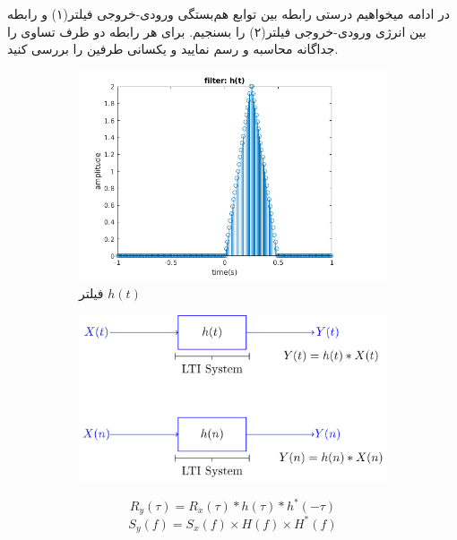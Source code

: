 \documentclass[14pt, professionalfont]{article}
\begin{document}
\begin{enumerate}
    در ادامه میخواهیم درستی رابطه بین توابع هم‌بستگی ورودی-خروجی فیلتر(۱) و رابطه بین انرژی ورودی-خروجی فیلتر(۲) را بسنجیم. برای هر رابطه دو طرف تساوی را جداگانه محاسبه و رسم نمایید و یکسانی طرفین را بررسی کنید.
    
   
\begin{figure}[h]
	\begin{subfigure}{.5\textwidth}
		\centering
		\includegraphics[scale = 0.30]{../images/filter.png}
		\caption{
			فیلتر
			$h(t)$
		}
	\end{subfigure}%
	\begin{subfigure}{.5\textwidth}
		\centering
		\includegraphics[scale = 0.70]{../images/lti.png}
		\caption{
		}
	\end{subfigure}
	\caption{ }
	\label{fig:fig}
\end{figure}

 \begin{equation}
R_y(\tau) = R_x(\tau)*h(\tau)*h^*(-\tau)
\end{equation} 
\begin{equation}
S_y(f) = S_x(f)\times H(f)\times H^*(f)
\end{equation}

	\end{enumerate}
\end{document}
